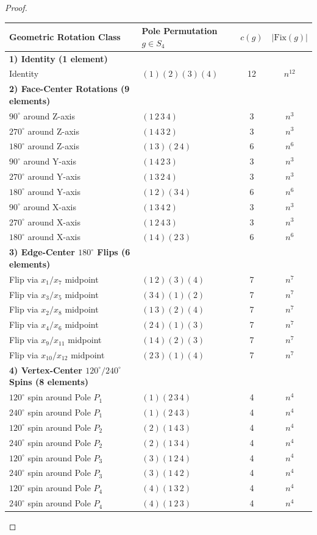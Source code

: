 \documentclass[addpoints,10pt]{exam}
\theoremstyle{plain}
\theoremstyle{definition}
\theoremstyle{plain}
\theoremstyle{plain}
\theoremstyle{definition}
\begin{document}
\begin{proof}
\noindent 
\bgroup
\def\arraystretch{1} 
\begin{center}
\begin{tabular}{l|l|c|c}
\textbf{Geometric Rotation Class} & \textbf{Pole Permutation $g \in S_4$} & $c(g)$ & $|\mathrm{Fix}(g)|$ \\
\hline
\textbf{1) Identity (1 element)} & & & \\
Identity & $(1)(2)(3)(4)$ & 12 & $n^{12}$ \\
\hline
\textbf{2) Face-Center Rotations (9 elements)} & & & \\
$90^\circ$ around Z-axis & $(1\,2\,3\,4)$ & 3 & $n^3$ \\
$270^\circ$ around Z-axis & $(1\,4\,3\,2)$ & 3 & $n^3$ \\
$180^\circ$ around Z-axis & $(1\,3)(2\,4)$ & 6 & $n^6$ \\
$90^\circ$ around Y-axis & $(1\,4\,2\,3)$ & 3 & $n^3$ \\
$270^\circ$ around Y-axis & $(1\,3\,2\,4)$ & 3 & $n^3$ \\
$180^\circ$ around Y-axis & $(1\,2)(3\,4)$ & 6 & $n^6$ \\
$90^\circ$ around X-axis & $(1\,3\,4\,2)$ & 3 & $n^3$ \\
$270^\circ$ around X-axis & $(1\,2\,4\,3)$ & 3 & $n^3$ \\
$180^\circ$ around X-axis & $(1\,4)(2\,3)$ & 6 & $n^6$ \\
\hline
\textbf{3) Edge-Center $180^\circ$ Flips (6 elements)} & & & \\
Flip via $x_1/x_7$ midpoint & $(1\,2)(3)(4)$ & 7 & $n^7$ \\
Flip via $x_3/x_5$ midpoint & $(3\,4)(1)(2)$ & 7 & $n^7$ \\
Flip via $x_2/x_8$ midpoint & $(1\,3)(2)(4)$ & 7 & $n^7$ \\
Flip via $x_4/x_6$ midpoint & $(2\,4)(1)(3)$ & 7 & $n^7$ \\
Flip via $x_9/x_{11}$ midpoint & $(1\,4)(2)(3)$ & 7 & $n^7$ \\
Flip via $x_{10}/x_{12}$ midpoint & $(2\,3)(1)(4)$ & 7 & $n^7$ \\
\hline
\textbf{4) Vertex-Center $120^\circ/240^\circ$ Spins (8 elements)} & & & \\
$120^\circ$ spin around Pole $P_1$ & $(1)(2\,3\,4)$ & 4 & $n^4$ \\
$240^\circ$ spin around Pole $P_1$ & $(1)(2\,4\,3)$ & 4 & $n^4$ \\
$120^\circ$ spin around Pole $P_2$ & $(2)(1\,4\,3)$ & 4 & $n^4$ \\
$240^\circ$ spin around Pole $P_2$ & $(2)(1\,3\,4)$ & 4 & $n^4$ \\
$120^\circ$ spin around Pole $P_3$ & $(3)(1\,2\,4)$ & 4 & $n^4$ \\
$240^\circ$ spin around Pole $P_3$ & $(3)(1\,4\,2)$ & 4 & $n^4$ \\
$120^\circ$ spin around Pole $P_4$ & $(4)(1\,3\,2)$ & 4 & $n^4$ \\
$240^\circ$ spin around Pole $P_4$ & $(4)(1\,2\,3)$ & 4 & $n^4$ \\
\end{tabular}
\end{center}
\egroup


\end{proof}
\end{document}
